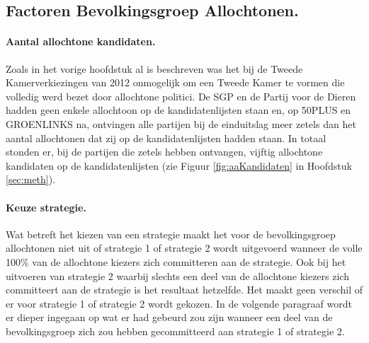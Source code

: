 \subsection{Factoren Bevolkingsgroep Allochtonen.}

\paragraph{Aantal allochtone kandidaten.} 
Zoals in het vorige hoofdstuk al is beschreven was het bij de Tweede Kamerverkiezingen van 2012 onmogelijk om een Tweede Kamer te vormen die volledig werd bezet door allochtone politici. De SGP en de Partij voor de Dieren hadden geen enkele allochtoon op de kandidatenlijsten staan en, op 50PLUS en GROENLINKS na, ontvingen alle partijen bij de einduitslag meer zetels dan het aantal allochtonen dat zij op de kandidatenlijsten hadden staan. In totaal stonden er, bij de partijen die zetels hebben ontvangen, vijftig allochtone kandidaten op de kandidatenlijsten (zie Figuur \ref{fig:aaKandidaten} in Hoofdstuk \ref{sec:meth}). 

\paragraph{Keuze strategie.}
Wat betreft het kiezen van een strategie maakt het voor de bevolkingsgroep allochtonen niet uit of strategie 1 of strategie 2 wordt uitgevoerd wanneer de volle 100\% van de allochtone kiezers zich committeren aan de strategie. Ook bij het uitvoeren van strategie 2 waarbij slechts een deel van de allochtone kiezers zich committeert aan de strategie is het resultaat hetzelfde. Het maakt geen verschil of er voor strategie 1 of strategie 2 wordt gekozen. In de volgende paragraaf wordt er dieper ingegaan op wat er had gebeurd zou zijn wanneer een deel van de bevolkingsgroep zich zou hebben gecommitteerd aan strategie 1 of strategie 2.




